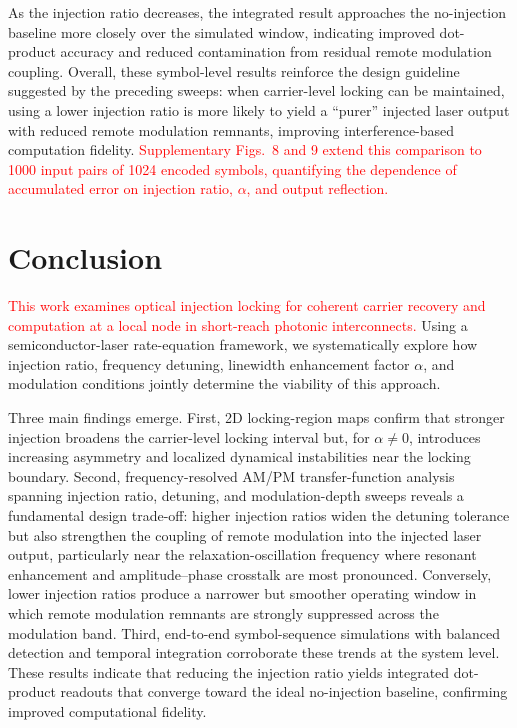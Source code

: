 \documentclass[%
 aip,
 apl,
 amsmath,amssymb,
 reprint,%
 floatfix,
]{revtex4-1}
\newcommand{\reviewreplace}[2]{\textcolor{red}{#2}}
\begin{document}
As the injection ratio decreases, the integrated result approaches the no-injection baseline more closely over the simulated window, indicating improved dot-product accuracy and reduced contamination from residual remote modulation coupling.
Overall, these symbol-level results reinforce the design guideline suggested by the preceding sweeps: when carrier-level locking can be maintained, using a lower injection ratio is more likely to yield a ``purer'' injected laser output with reduced remote modulation remnants, improving interference-based computation fidelity.
\textcolor{red}{Supplementary Figs.~8 and 9 extend this comparison to 1000 input pairs of 1024 encoded symbols, quantifying the dependence of accumulated error on injection ratio, $\alpha$, and output reflection.}



\section{Conclusion}

\reviewreplace{This work presents a theoretical and simulation-based assessment of optical injection locking as a mechanism for maintaining mutual coherence between a remotely modulated source and a local processing node, enabling distributed, real-time coherent photonic computing without optical-to-electrical conversion.}{This work examines optical injection locking for coherent carrier recovery and computation at a local node in short-reach photonic interconnects.} Using a semiconductor-laser rate-equation framework, we systematically explore how injection ratio, frequency detuning, linewidth enhancement factor $\alpha$, and modulation conditions jointly determine the viability of this approach.

Three main findings emerge. First, 2D locking-region maps confirm that stronger injection broadens the carrier-level locking interval but, for $\alpha \neq 0$, introduces increasing asymmetry and localized dynamical instabilities near the locking boundary. Second, frequency-resolved AM/PM transfer-function analysis spanning injection ratio, detuning, and modulation-depth sweeps reveals a fundamental design trade-off: higher injection ratios widen the detuning tolerance but also strengthen the coupling of remote modulation into the injected laser output, particularly near the relaxation-oscillation frequency where resonant enhancement and amplitude--phase crosstalk are most pronounced. Conversely, lower injection ratios produce a narrower but smoother operating window in which remote modulation remnants are strongly suppressed across the modulation band. Third, end-to-end symbol-sequence simulations with balanced detection and temporal integration corroborate these trends at the system level. These results indicate that reducing the injection ratio yields integrated dot-product readouts that converge toward the ideal no-injection baseline, confirming improved computational fidelity.
\end{document}
